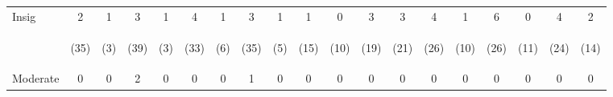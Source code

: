\begin{tabular}{lcccccccccccccccccc}
\hline \noalign{\smallskip}Insig & 2 & 1 & 3 & 1 & 4 & 1 & 3 & 1 & 1 & 0 & 3 & 3 & 4 & 1 & 6 & 0 & 4 & 2\\
 & \begin{footnotesize}(35)\end{footnotesize} & \begin{footnotesize}(3)\end{footnotesize} & \begin{footnotesize}(39)\end{footnotesize} & \begin{footnotesize}(3)\end{footnotesize} & \begin{footnotesize}(33)\end{footnotesize} & \begin{footnotesize}(6)\end{footnotesize} & \begin{footnotesize}(35)\end{footnotesize} & \begin{footnotesize}(5)\end{footnotesize} & \begin{footnotesize}(15)\end{footnotesize} & \begin{footnotesize}(10)\end{footnotesize} & \begin{footnotesize}(19)\end{footnotesize} & \begin{footnotesize}(21)\end{footnotesize} & \begin{footnotesize}(26)\end{footnotesize} & \begin{footnotesize}(10)\end{footnotesize} & \begin{footnotesize}(26)\end{footnotesize} & \begin{footnotesize}(11)\end{footnotesize} & \begin{footnotesize}(24)\end{footnotesize} & \begin{footnotesize}(14)\end{footnotesize}\\
\noalign{\smallskip}Moderate & 0 & 0 & 2 & 0 & 0 & 0 & 1 & 0 & 0 & 0 & 0 & 0 & 0 & 0 & 0 & 0 & 0 & 0\\

\end{tabular}
